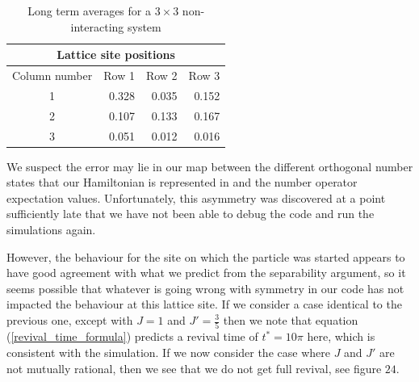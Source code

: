 \documentclass[prb, twocolumn, final]{revtex4-1}
\theoremstyle{plain}
\begin{document}
\begin{table}[H]
 \centering
 \begin{tabular}{crrr}
  \multicolumn{4}{c}{Lattice site positions}\\
  \hline
  Column number &     Row 1     &     Row 2     &     Row 3\\
  \hline
   1            &     0.328     &     0.035     &     0.152\\
   2            &     0.107     &     0.133     &     0.167\\
   3            &     0.051     &     0.012     &     0.016\\
   \hline
 \end{tabular}
 \caption{Long term averages for a $3\times3$ non-interacting system}
 \label{table:longterm3by3U0}
\end{table}
We suspect the error may lie in our map between the different orthogonal
number states that our Hamiltonian is represented in and the number operator
expectation values. Unfortunately, this asymmetry was discovered at a point
sufficiently late that we have not been able to debug the code and run the
simulations again.

However, the behaviour for the site on which the particle was started appears
to have good agreement with what we predict from the separability argument, so
it seems possible that whatever is going wrong with symmetry in our code has
not impacted the behaviour at this lattice site.
If we consider a case identical to the previous one, except with $J=1$ and $J' =
\tfrac{3}{5}$ then we note that equation (\ref{revival_time_formula}) predicts a
revival time of $t^{\ast}=10\pi$ here, which is consistent with the simulation.
If we now consider the case where $J$ and $J'$ are not mutually rational,
then we see that we do not get full revival, see figure $24$.
\end{document}
